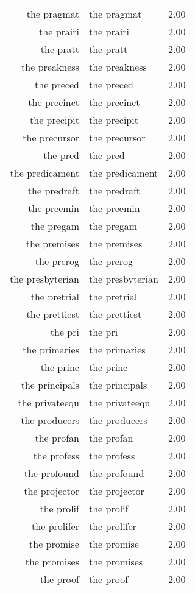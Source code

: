 \begin{table}[ht]
\begin{tabular}{rlr}
  the pragmat & the pragmat & 2.00 \\ 
  the prairi & the prairi & 2.00 \\ 
  the pratt & the pratt & 2.00 \\ 
  the preakness & the preakness & 2.00 \\ 
  the preced & the preced & 2.00 \\ 
  the precinct & the precinct & 2.00 \\ 
  the precipit & the precipit & 2.00 \\ 
  the precursor & the precursor & 2.00 \\ 
  the pred & the pred & 2.00 \\ 
  the predicament & the predicament & 2.00 \\ 
  the predraft & the predraft & 2.00 \\ 
  the preemin & the preemin & 2.00 \\ 
  the pregam & the pregam & 2.00 \\ 
  the premises & the premises & 2.00 \\ 
  the prerog & the prerog & 2.00 \\ 
  the presbyterian & the presbyterian & 2.00 \\ 
  the pretrial & the pretrial & 2.00 \\ 
  the prettiest & the prettiest & 2.00 \\ 
  the pri & the pri & 2.00 \\ 
  the primaries & the primaries & 2.00 \\ 
  the princ & the princ & 2.00 \\ 
  the principals & the principals & 2.00 \\ 
  the privateequ & the privateequ & 2.00 \\ 
  the producers & the producers & 2.00 \\ 
  the profan & the profan & 2.00 \\ 
  the profess & the profess & 2.00 \\ 
  the profound & the profound & 2.00 \\ 
  the projector & the projector & 2.00 \\ 
  the prolif & the prolif & 2.00 \\ 
  the prolifer & the prolifer & 2.00 \\ 
  the promise & the promise & 2.00 \\ 
  the promises & the promises & 2.00 \\ 
  the proof & the proof & 2.00 \\ 

\end{tabular}
\end{table}

